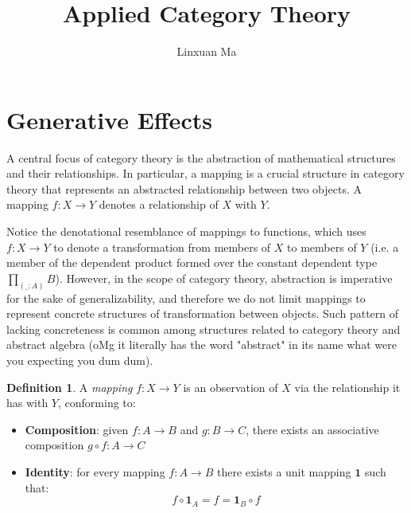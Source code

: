 \documentclass[12pt]{article}
\title{Applied Category Theory}
\author{Linxuan Ma}
\theoremstyle{definition}
\newtheorem{defn}{Definition}[section]
\begin{document}
	\maketitle
	
	
	\section{Generative Effects}
	
	A central focus of category theory is the abstraction of mathematical structures and their relationships. In particular, a mapping is a crucial structure in category theory that represents an abstracted relationship between two objects. A mapping $f: X \to Y$ denotes a relationship of $X$ with $Y$.
	
	Notice the denotational resemblance of mappings to functions, which uses $f: X \to Y$ to denote a transformation from members of $X$ to members of $Y$ (i.e. a member of the dependent product formed over the constant dependent type $\prod_{(\_:A)}B$). However, in the scope of category theory, abstraction is imperative for the sake of generalizability, and therefore we do not limit mappings to represent concrete structures of transformation between objects. Such pattern of lacking concreteness is common among structures related to category theory and abstract algebra (oMg it literally has the word "abstract" in its name what were you expecting you dum dum).
	
	\begin{defn}
		A \emph{mapping} $f: X \to Y$ is an observation of $X$ via the relationship it has with $Y$, conforming to:
		\begin{itemize}
			\item \textbf{Composition}: given $f: A \to B$ and $g: B \to C$, there exists an associative composition $g \circ f: A \to C$
			\item \textbf{Identity}: for every mapping $f: A \to B$ there exists a unit mapping $\textbf{1}$ such that: $$f \circ \textbf{1}_A = f = \textbf{1}_B \circ f$$
		\end{itemize}
	\end{defn}
	
\end{document}
